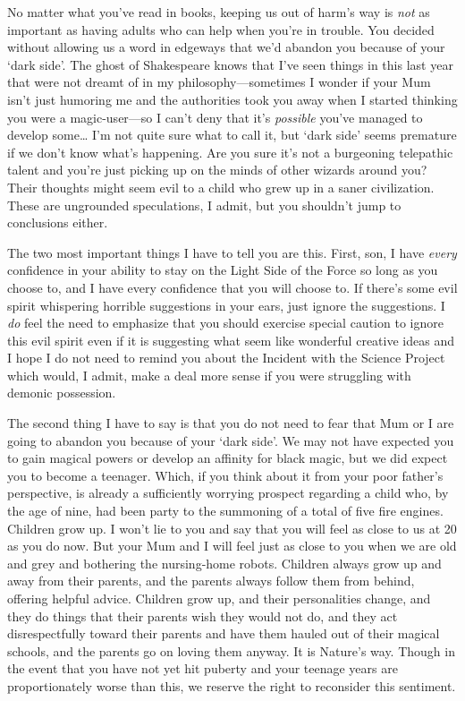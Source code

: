 \begin{writtenNote}

No matter what you've read in books, keeping us out of harm's way is \emph{not} as important as having adults who can help when you're in trouble. You decided without allowing us a word in edgeways that we'd abandon you because of your `dark side'. The ghost of Shakespeare knows that I've seen things in this last year that were not dreamt of in my philosophy—sometimes I wonder if your Mum isn't just humoring me and the authorities took you away when I started thinking you were a magic-user—so I can't deny that it's \emph{possible} you've managed to develop some{\ldots} I'm not quite sure what to call it, but `dark side' seems premature if we don't know what's happening. Are you sure it's not a burgeoning telepathic talent and you're just picking up on the minds of other wizards around you? Their thoughts might seem evil to a child who grew up in a saner civilization. These are ungrounded speculations, I admit, but you shouldn't jump to conclusions either.

The two most important things I have to tell you are this. First, son, I have \emph{every} confidence in your ability to stay on the Light Side of the Force so long as you choose to, and I have every confidence that you will choose to. If there's some evil spirit whispering horrible suggestions in your ears, just ignore the suggestions. I \emph{do} feel the need to emphasize that you should exercise special caution to ignore this evil spirit even if it is suggesting what seem like wonderful creative ideas and I hope I do not need to remind you about the Incident with the Science Project which would, I admit, make a deal more sense if you were struggling with demonic possession.

The second thing I have to say is that you do not need to fear that Mum or I are going to abandon you because of your `dark side'. We may not have expected you to gain magical powers or develop an affinity for black magic, but we did expect you to become a teenager. Which, if you think about it from your poor father's perspective, is already a sufficiently worrying prospect regarding a child who, by the age of nine, had been party to the summoning of a total of five fire engines. Children grow up. I won't lie to you and say that you will feel as close to us at 20 as you do now. But your Mum and I will feel just as close to you when we are old and grey and bothering the nursing-home robots. Children always grow up and away from their parents, and the parents always follow them from behind, offering helpful advice. Children grow up, and their personalities change, and they do things that their parents wish they would not do, and they act disrespectfully toward their parents and have them hauled out of their magical schools, and the parents go on loving them anyway. It is Nature's way. Though in the event that you have not yet hit puberty and your teenage years are proportionately worse than this, we reserve the right to reconsider this sentiment.


\end{writtenNote}
